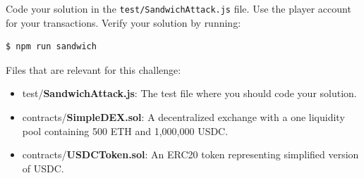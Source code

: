 \documentclass[12pt]{article}
\begin{document}
\noindent
Code your solution in the \texttt{test/SandwichAttack.js} file. Use the player account for your transactions. Verify your solution by running:

\begin{verbatim}
$ npm run sandwich
\end{verbatim}

\noindent
Files that are relevant for this challenge:
\begin{itemize}
\item test/\textbf{SandwichAttack.js}: The test file where you should code your solution.
\item contracts/\textbf{SimpleDEX.sol}: A decentralized exchange with a one liquidity pool containing 500 ETH and 1,000,000 USDC.
\item contracts/\textbf{USDCToken.sol}: An ERC20 token representing simplified version of USDC.
\end{itemize}
\end{document}

